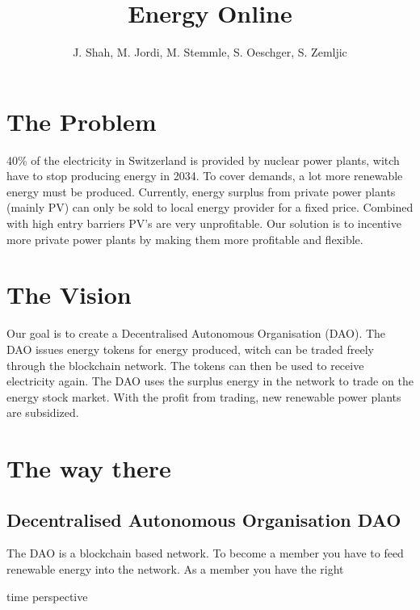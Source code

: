 \documentclass{scrartcl}
\begin{document}
	
	\title{Energy Online}
	\subtitle{}
	\author{J. Shah, M. Jordi, M. Stemmle, S. Oeschger, S. Zemljic}
	
	\maketitle
	
	\section{The Problem}
	
	40\% of the electricity in Switzerland is provided by nuclear power plants, witch have to stop producing energy in 2034. To cover demands, a lot more renewable energy must be produced. 
	Currently, energy surplus from private power plants (mainly PV) can only be sold to local energy provider for a fixed price. Combined with high entry barriers PV's are very unprofitable.
	Our solution is to incentive more private power plants by making them more profitable and flexible.
	
	\section{The Vision}
	Our goal is to create a Decentralised Autonomous Organisation (DAO). The DAO issues energy tokens for energy produced, witch can be traded freely through the blockchain network. The tokens can then be used to receive electricity again. The DAO uses the surplus energy in the network to trade on the energy stock market. With the profit from trading, new renewable power plants are subsidized. 
	
	\section{The way there}
	
	\subsection{Decentralised Autonomous Organisation DAO}
	The DAO is a blockchain based network. To become a member you have to feed renewable energy into the network. As a member you have the right
	
	time perspective
	
\end{document}

